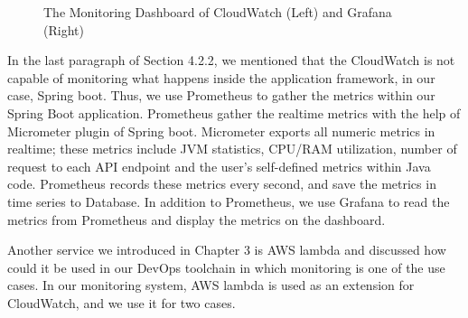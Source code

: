 \begin{figure}[!tbp]
\begin{minipage}[b]{0.50\textwidth}
     \end{minipage}
     \caption{The Monitoring Dashboard of CloudWatch (Left) and Grafana (Right)}
     \label{fig:monitoring}
   \end{figure}
\par
In the last paragraph of Section 4.2.2, we mentioned that the CloudWatch is not capable of monitoring what happens inside the application framework, in our case, Spring boot. Thus, we use Prometheus to gather the metrics within our Spring Boot application. Prometheus gather the realtime metrics with the help of Micrometer plugin of Spring boot. Micrometer exports all numeric metrics in realtime; these metrics include JVM statistics, CPU/RAM utilization, number of request to each API endpoint and the user's self-defined metrics within Java code. Prometheus records these metrics every second, and save the metrics in time series to Database. In addition to Prometheus, we use Grafana to read the metrics from Prometheus and display the metrics on the dashboard.
\par
Another service we introduced in Chapter 3 is AWS lambda and discussed how could it be used in our DevOps toolchain in which monitoring is one of the use cases. In our monitoring system, AWS lambda is used as an extension for CloudWatch, and we use it for two cases.
